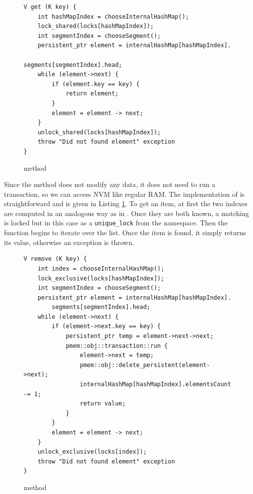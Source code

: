 \begin{figure}[ht]
\renewcommand{\figurename}{Listing}
\begin{lstlisting}
V get (K key) {
    int hashMapIndex = chooseInternalHashMap();
    lock_shared(locks[hashMapIndex]);
    int segmentIndex = chooseSegment();
    persistent_ptr element = internalHashMap[hashMapIndex].
                                    segments[segmentIndex].head;
    while (element->next) {
        if (element.key == key) {
            return element;
        }
        element = element -> next;
    }
    unlock_shared(locks[hashMapIndex]);
    throw "Did not found element" exception
}
\end{lstlisting}
\caption{\getMethod method}
\label{getMethod}
\end{figure}

        Since the \getMethod method does not modify any data, it does not need to run a transaction, so we can access NVM like regular RAM.
        The implementation of \getMethod is straightforward and is given in Listing \ref{getMethod}.
        To get an item, at first the two indexes are computed in an analogous way as in \insertMethod. 
        Once they are both known, a matching \internalHashMap is locked but in this case as a \texttt{unique\_lock} \cite{UniqueLock} from the \std namespace.
        Then the function begins to iterate over the list. 
        Once the item is found, it simply returns its value, otherwise an exception is thrown.
        
\begin{figure}[ht]
\renewcommand{\figurename}{Listing}
\begin{lstlisting}
V remove (K key) {
    int index = chooseInternalHashMap();
    lock_exclusive(locks[hashMapIndex]);
    int segmentIndex = chooseSegment();
    persistent_ptr element = internalHashMap[hashMapIndex].
        segments[segmentIndex].head;
    while (element->next) {
        if (element->next.key == key) {
            persistent_ptr temp = element->next->next;
            pmem::obj::transaction::run {
                element->next = temp;
                pmem::obj::delete_persistent(element->next);
                internalHashMap[hashMapIndex].elementsCount -= 1;
                return value;
            }
        }
        element = element -> next;
    } 
    unlock_exclusive(locks[index]);
    throw "Did not found element" exception
}
\end{lstlisting}
\caption{\removeMethod method}
\label{removeMethod}
\end{figure}

